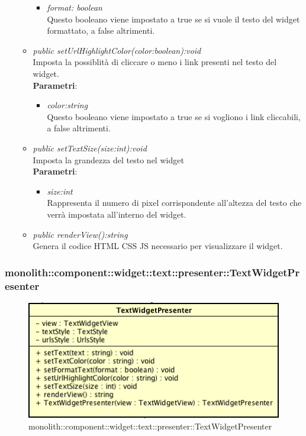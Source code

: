 \begin{itemize}
\begin{itemize}
\begin{itemize}
		\item \textit{format: boolean}\\
		Questo booleano viene impostato a true se si vuole il testo del widget formattato, a false altrimenti.
		\end{itemize} 
	\item \textit{public setUrlHighlightColor(color:boolean):void}\\
	Imposta la possiblità di cliccare o meno i link presenti nel testo del widget.
		\\ \textbf{Parametri}: \begin{itemize}
		\item \textit{color:string}\\
		Questo booleano viene impostato a true se si vogliono i link cliccabili, a false altrimenti.
		\end{itemize} 
	\item \textit{public setTextSize(size:int):void}\\
	Imposta la grandezza del testo nel widget
		\\ \textbf{Parametri}: \begin{itemize}
		\item \textit{size:int}\\
		Rappresenta il numero di pixel corrispondente all'altezza del testo che verrà impostata all'interno del widget.
		\end{itemize} 
	\item \textit{public renderView():string}\\
	Genera il codice HTML CSS JS necessario per visualizzare il widget.
	\end{itemize}
\end{itemize}

\subsubsection{monolith::component::widget::text::presenter::TextWidgetPresenter}

\label{monolith::component::widget::text::presenter::TextWidgetPresenter}
\begin{figure}[H]
	\centering
	\includegraphics[scale=0.5]{Sezioni/SottosezioniST/img/TextWidgetPresenter.png}
	\caption{monolith::component::widget::text::presenter::TextWidgetPresenter}
\end{figure}

